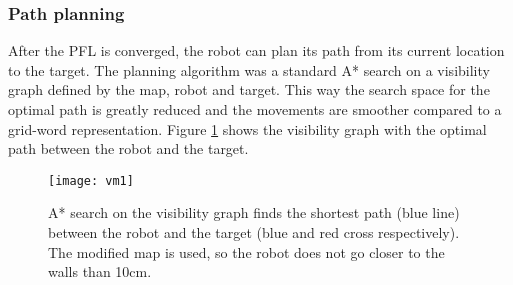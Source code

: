 	\subsubsection{Path planning} 	
	
		After the PFL is converged, the robot can plan its path from its current location to the target. The planning algorithm was a standard A* search \parencite{introduction_astar} on a visibility graph \parencite{choset_principles_2005} defined by the map, robot and target. This way the search space for the optimal path is greatly reduced and the movements are smoother compared to a grid-word representation. Figure \ref{fig:vm1} shows the visibility graph with the optimal path between the robot and the target.
		
		\begin{figure}[h]
		    \centering
  	 		\texttt{[image: vm1]}
		    \caption{A* search on the visibility graph finds the shortest path (blue line) between the robot and the target (blue and red cross respectively). The modified map is used, so the robot does not go closer to the walls than 10cm.}
		    \label{fig:vm1}
	 	\end{figure}
	 	
		\FloatBarrier